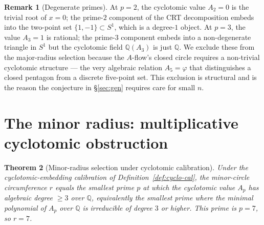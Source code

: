 \documentclass[11pt,reqno]{amsart}
\theoremstyle{plain}
\newtheorem{theorem}{Theorem}
\theoremstyle{definition}
\newtheorem{remark}[theorem]{Remark}
\newcommand{\Q}{\mathbb{Q}}
\begin{document}
\begin{remark}[Degenerate primes] \label{rem:degenerate}
At $p = 2$, the cyclotomic value $A_2 = 0$ is the trivial root of $x = 0$; the prime-$2$ component of the CRT decomposition embeds into the two-point set $\{1, -1\} \subset S^{1}$, which is a degree-$1$ object. At $p = 3$, the value $A_3 = 1$ is rational; the prime-$3$ component embeds into a non-degenerate triangle in $S^{1}$ but the cyclotomic field $\Q(A_3)$ is just $\Q$. We exclude these from the major-radius selection because the $A$-flow's closed circle requires a non-trivial cyclotomic structure --- the very algebraic relation $A_5 = \varphi$ that distinguishes a closed pentagon from a discrete five-point set. This exclusion is structural and is the reason the conjecture in \S\ref{sec:gen} requires care for small $n$.
\end{remark}


\section{The minor radius: multiplicative cyclotomic obstruction} \label{sec:r-minor}

\begin{theorem}[Minor-radius selection under cyclotomic calibration] \label{thm:r-forced}
Under the cyclotomic-embedding calibration of Definition~\ref{def:cyclo-cal}, the minor-circle circumference $r$ equals the smallest prime $p$ at which the cyclotomic value $A_p$ has algebraic degree $\geq 3$ over $\Q$, equivalently the smallest prime where the minimal polynomial of $A_p$ over $\Q$ is irreducible of degree $3$ or higher. This prime is $p = 7$, so $r = 7$.
\end{theorem}
\end{document}
